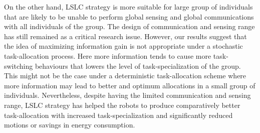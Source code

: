 \documentclass[journal]{IEEEtran}
\begin{document}
On the other hand, LSLC strategy is more suitable for large group of individuals that are likely to be unable to perform global sensing and global communications with all individuals of the group. The design of communication and sensing range has still remained as a critical research issue. However, our results suggest that the idea of maximizing information gain is not appropriate under a stochastic task-allocation process. Here more information tends to cause more task-switching behaviours that lowers the level of task-specialization of the group. This might not be the case under a deterministic task-allocation scheme where more information may lead to better and optimum allocations in  a small group of individuals. Nevertheless, despite having the limited communication and sensing range, LSLC strategy has helped the robots to produce comparatively better task-allocation with increased task-specialization and significantly reduced motions or savings in energy consumption.


%
% 
%
%
%
%
\end{document}
